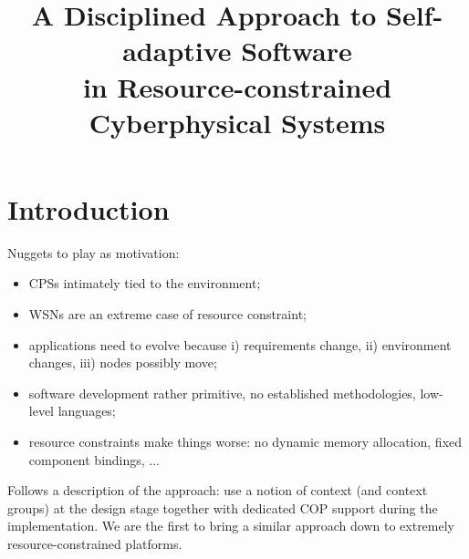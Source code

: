 \documentclass[10pt, conference, compsocconf]{IEEEtran}
\begin{document}
\title{A Disciplined Approach to Self-adaptive Software\\ in Resource-constrained Cyberphysical Systems}


\author{}


\maketitle



\section{Introduction}

\noindent Nuggets to play as motivation:
\begin{itemize}
\item CPSs intimately tied to the environment;
\item WSNs are an extreme case of resource constraint;
\item applications need to evolve because i)  requirements change,
  ii) environment changes, iii) nodes possibly move;
\item software development rather primitive, no established methodologies, low-level languages;
\item resource constraints make things worse: no dynamic memory
  allocation, fixed component bindings, ...
\end{itemize}

Follows a description of the approach: use a notion of context (and
context groups) at the design stage together with dedicated COP
support during the implementation. We are the first to bring a similar
approach down to extremely resource-constrained platforms.
\end{document}
